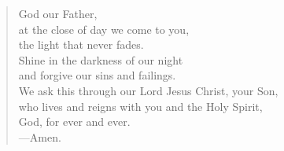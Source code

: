 \prayer

\setlength{\leftmargini}{\prayerleftmargini}

\begin{verse}
God our Father,\\
at the close of day we come to you,\\
the light that never fades.\\
Shine in the darkness of our night\\
and forgive our sins and failings.\\
We ask this through our Lord Jesus Christ, your Son,\\
who lives and reigns with you and the Holy Spirit,\\
God, for ever and ever.\\
{\color{red}---\thinspace}Amen.
\end{verse}

\setlength{\leftmargini}{\defleftmargini}